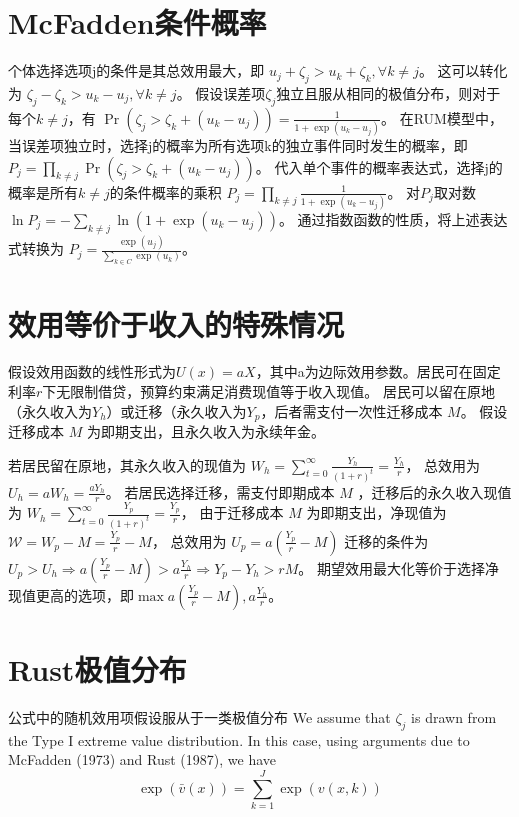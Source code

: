 \documentclass[a4paper, zihao=-4, fontset = mac, oneside]{ctexbook} %
\begin{document}
\chapter{McFadden条件概率}

个体选择选项j的条件是其总效用最大，即
$u_j + \zeta_j > u_k + \zeta_k, \forall k \neq j$。
这可以转化为
$\zeta_j - \zeta_k > u_k - u_j, \forall k \neq j$。
假设误差项$\zeta_j$独立且服从相同的极值分布，则对于每个$k \neq j$，有
$\Pr(\zeta_j > \zeta_k + (u_k - u_j)) = \frac{1}{1 + \exp(u_k - u_j)}$。
在RUM模型中，当误差项独立时，选择j的概率为所有选项k的独立事件同时发生的概率，即
$P_j = \prod\limits_{k \neq j} \Pr(\zeta_j > \zeta_k + (u_k - u_j))$。
代入单个事件的概率表达式，选择j的概率是所有$k \neq j$的条件概率的乘积
$P_j = \prod\limits_{k \neq j} \frac{1}{1 + \exp(u_k - u_j)}$。
对$P_j$取对数
$\ln P_j = - \sum_{k \neq j} \ln(1 + \exp(u_k - u_j))$。
通过指数函数的性质，将上述表达式转换为
$P_j = \frac{\exp(u_j)}{\sum\limits_{k \in C} \exp(u_k)}$。

\chapter{效用等价于收入的特殊情况}
假设效用函数的线性形式为$U(x)=a X$，其中a为边际效用参数。居民可在固定利率$r$下无限制借贷，预算约束满足消费现值等于收入现值。
居民可以留在原地（永久收入为$Y_h$）或迁移（永久收入为$Y_p$，后者需支付一次性迁移成本 $M$。
假设迁移成本 
$M$
为即期支出，且永久收入为永续年金。

若居民留在原地，其永久收入的现值为
$W_h = \sum\limits_{t=0}^\infty \frac{Y_h}{(1+r)^t}=\frac{Y_h}{r}$，
总效用为$U_h=a W_h = \frac{a Y_h}{r}$。
若居民选择迁移，需支付即期成本 
$M$
，迁移后的永久收入现值为
$W_h = \sum\limits_{t=0}^\infty \frac{Y_p}{(1+r)^t}=\frac{Y_p}{r}$，
由于迁移成本 
$M$
为即期支出，净现值为
$\mathcal{W}=W_p-M=\frac{Y_p}{r}-M$，
总效用为
$U_p=a(\frac{Y_p}{r}-M)$
迁移的条件为$U_p>U_h \Rightarrow a(\frac{Y_p}{r}-M) > a \frac{ Y_h}{r} \Rightarrow Y_p-Y_h > rM$。
期望效用最大化等价于选择净现值更高的选项，即$\max{a(\frac{Y_p}{r}-M), a \frac{ Y_h}{r}}$。

\chapter{Rust极值分布}
公式中的随机效用项假设服从于一类极值分布
We assume that $\zeta_j$ is drawn from the Type I extreme value distribution. In this case, using arguments due to McFadden (1973) and Rust (1987), we have
$$\exp\left(\bar{v}(x)\right) = \sum_{k=1}^J \exp\left(v(x, k)\right)$$
\end{document}
